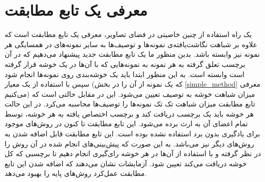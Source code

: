 \section{معرفی یک تابع مطابقت}\label{copatibility_function}
یک راه استفاده از چنین خاصیتی در فضای تصاویر، معرفی یک تابع مطابقت است که علاوه بر شباهت نگاشت‌یافته‌ی نمونه‌ها و توصیف‌ها به سایر نمونه‌های در همسایگی هر نمونه نیز وابسته باشد. بدین منظور ما یک تابع مطابقت جدید پیشنهاد می‌دهیم که در آن برچسب تعلق گرفته به هر نمونه به نمونه‌هایی که با آن‌ها در یک خوشه قرار گرفته است وابسته است. به این منظور ابتدا باید یک خوشه‌بندی روی نمونه‌ها انجام شود سپس با استفاده از یک معیار (که یک نمونه از آن را در بخش \ref{simple_method} معرفی می‌کنیم) میزان شباهت خوشه به توصیف تعیین می‌شود. این در مقابل حالتی است که تابع مطابقت میزان شباهت تک تک نمونه‌ها را توصیف‌ها محاسبه می‌کرد.
 در این حالت هر خوشه باید یک برچسب دریافت کند و برچسب اختصاص یافته به هر خوشه، توسط تمام اعضای آن به ارث برده می‌شود. این تابع مطابقت تا کنون در روش‌های موجود برای یادگیری بدون برد استفاده نشده بوده است. این تابع مطابقت قابل اضافه شدن به روش‌های دیگر نیز می‌باشد. به این صورت که پیش‌بینی‌های انجام شده در آن روش را در نظر گرفته و با استفاده از آن‌ها در هر خوشه رای‌گیری انجام دهیم تا برچسبی که کل خوشه دریافت می‌کند تعیین شود. آزمایشات نشان می‌دهند که  اضافه شدن این تابع مطابقت عمل‌کرد روش‌های پایه را بهبود می‌دهد.

